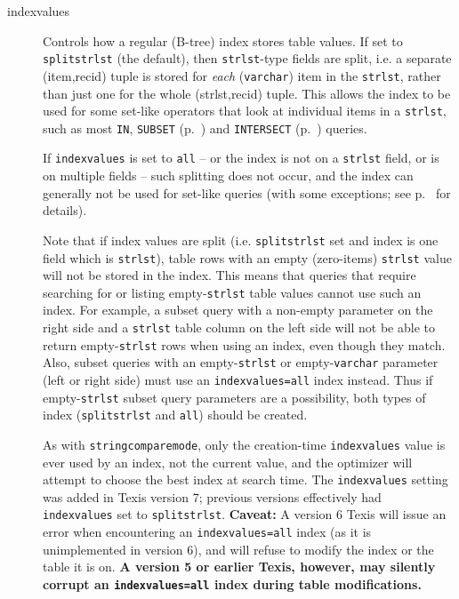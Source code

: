 \begin{description}
\item[indexvalues]
\label{indexvalues}
  Controls how a regular (B-tree) index stores table values.  If set
  to {\tt splitstrlst} (the default), then \verb`strlst`-type fields
  are split, i.e. a separate (item,recid) tuple is stored for {\em
  each} (\verb`varchar`) item in the \verb`strlst`, rather than just
  one for the whole (strlst,recid) tuple.  This allows the index to be
  used for some set-like operators that look at individual items in a
  \verb`strlst`, such as most \verb`IN`, \verb`SUBSET`
  (p.~\pageref{SubsetOperator}) and \verb`INTERSECT`
  (p.~\pageref{IntersectOperator}) queries.

  If \verb`indexvalues` is set to \verb`all` -- or the index is not on
  a \verb`strlst` field, or is on multiple fields -- such splitting
  does not occur, and the index can generally not be used for set-like
  queries (with some exceptions; see p.~\pageref{SubsetIndexUsage} for
  details).

  Note that if index values are split (i.e. \verb`splitstrlst` set and
  index is one field which is \verb`strlst`), table rows with an empty
  (zero-items) \verb`strlst` value will not be stored in the index.
  This means that queries that require searching for or listing
  empty-\verb`strlst` table values cannot use such an index.  For
  example, a subset query with a non-empty parameter on the right side
  and a \verb`strlst` table column on the left side will not be able
  to return empty-\verb`strlst` rows when using an index, even though
  they match.  Also, subset queries with an empty-\verb`strlst` or
  empty-\verb`varchar` parameter (left or right side) must use an
  \verb`indexvalues=all` index instead.  Thus if empty-\verb`strlst`
  subset query parameters are a possibility, both types of index
  (\verb`splitstrlst` and \verb`all`) should be created.

  As with \verb`stringcomparemode`, only the creation-time
  \verb`indexvalues` value is ever used by an index, not the current
  value, and the optimizer will attempt to choose the best index at
  search time.  The \verb`indexvalues` setting was added in Texis
  version 7; previous versions effectively had \verb`indexvalues` set
  to \verb`splitstrlst`.  {\bf Caveat:} A version 6 Texis will issue
  an error when encountering an {\tt indexvalues=all} index (as it is
  unimplemented in version 6), and will refuse to modify the index or
  the table it is on.  {\bf A version 5 or earlier Texis, however, may
  silently corrupt an {\tt indexvalues=all} index during table
  modifications.}


\end{description}
